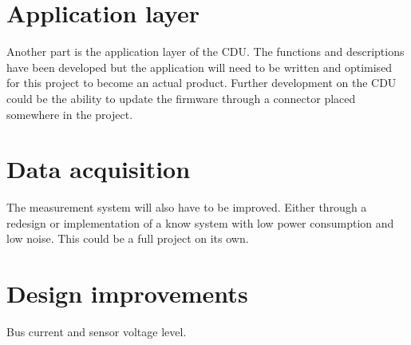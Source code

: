 \section{Application layer}
Another part is the application layer of the CDU. The functions and descriptions have been developed but the application will need to be written and optimised for this project to become an actual product. Further development on the CDU could be the ability to update the firmware through a connector placed somewhere in the project.

\section{Data acquisition}
The measurement system will also have to be improved. Either through a redesign or implementation of a know system with low power consumption and low noise. This could be a full project on its own.

\section{Design improvements}
Bus current and sensor voltage level.
